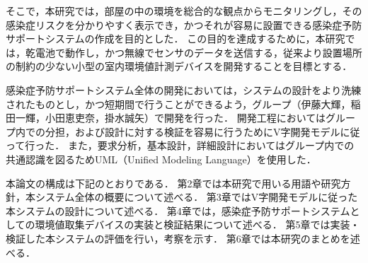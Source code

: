 そこで，本研究では，部屋の中の環境を総合的な観点からモニタリングし，その感染症リスクを分かりやすく表示でき，かつそれが容易に設置できる感染症予防サポートシステムの作成を目的とした．
この目的を達成するために，本研究では，乾電池で動作し，かつ無線でセンサのデータを送信する，従来より設置場所の制約の少ない小型の室内環境値計測デバイスを開発することを目標とする．

感染症予防サポートシステム全体の開発においては，システムの設計をより洗練されたものとし，かつ短期間で行うことができるよう，グループ（伊藤大輝，稲田一輝，小田恵吏奈，掛水誠矢）で開発を行った．
開発工程においてはグループ内での分担，および設計に対する検証を容易に行うためにV字開発モデルに従って行った．
また，要求分析，基本設計，詳細設計においてはグループ内での共通認識を図るためUML（Unified Modeling Language）を使用した．

本論文の構成は下記のとおりである．
第2章では本研究で用いる用語や研究方針，本システム全体の概要について述べる．
第3章ではV字開発モデルに従った本システムの設計について述べる．
第4章では，感染症予防サポートシステムとしての環境値取集デバイスの実装と検証結果について述べる．
第5章では実装・検証した本システムの評価を行い，考察を示す．
第6章では本研究のまとめを述べる．

%
%
%
